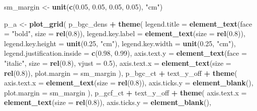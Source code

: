 \documentclass[
]{article}
\newenvironment{Shaded}{\begin{snugshade}}{\end{snugshade}}
\newcommand{\AttributeTok}[1]{\textcolor[rgb]{0.13,0.29,0.53}{#1}}
\newcommand{\FloatTok}[1]{\textcolor[rgb]{0.00,0.00,0.81}{#1}}
\newcommand{\FunctionTok}[1]{\textcolor[rgb]{0.13,0.29,0.53}{\textbf{#1}}}
\newcommand{\NormalTok}[1]{#1}
\newcommand{\OtherTok}[1]{\textcolor[rgb]{0.56,0.35,0.01}{#1}}
\newcommand{\SpecialCharTok}[1]{\textcolor[rgb]{0.81,0.36,0.00}{\textbf{#1}}}
\newcommand{\StringTok}[1]{\textcolor[rgb]{0.31,0.60,0.02}{#1}}
\begin{document}
\begin{Shaded}
\begin{Highlighting}[]
\NormalTok{sm\_margin }\OtherTok{\textless{}{-}} \FunctionTok{unit}\NormalTok{(}\FunctionTok{c}\NormalTok{(}\FloatTok{0.05}\NormalTok{, }\FloatTok{0.05}\NormalTok{, }\FloatTok{0.05}\NormalTok{, }\FloatTok{0.05}\NormalTok{), }\StringTok{"cm"}\NormalTok{)}

\NormalTok{p\_a }\OtherTok{\textless{}{-}} \FunctionTok{plot\_grid}\NormalTok{(}
\NormalTok{  p\_bgc\_dens }\SpecialCharTok{+} \FunctionTok{theme}\NormalTok{(}
    \AttributeTok{legend.title =} \FunctionTok{element\_text}\NormalTok{(}\AttributeTok{face =} \StringTok{"bold"}\NormalTok{, }\AttributeTok{size =} \FunctionTok{rel}\NormalTok{(}\FloatTok{0.8}\NormalTok{)),}
    \AttributeTok{legend.key.label =} \FunctionTok{element\_text}\NormalTok{(}\AttributeTok{size =} \FunctionTok{rel}\NormalTok{(}\FloatTok{0.8}\NormalTok{)),}
    \AttributeTok{legend.key.height =} \FunctionTok{unit}\NormalTok{(}\FloatTok{0.25}\NormalTok{, }\StringTok{"cm"}\NormalTok{),}
    \AttributeTok{legend.key.width =} \FunctionTok{unit}\NormalTok{(}\FloatTok{0.25}\NormalTok{, }\StringTok{"cm"}\NormalTok{),}
    \AttributeTok{legend.justification.inside =} \FunctionTok{c}\NormalTok{(}\FloatTok{0.98}\NormalTok{, }\FloatTok{0.99}\NormalTok{),}
    \AttributeTok{axis.text.y =} \FunctionTok{element\_text}\NormalTok{(}\AttributeTok{face =} \StringTok{"italic"}\NormalTok{, }\AttributeTok{size =} \FunctionTok{rel}\NormalTok{(}\FloatTok{0.8}\NormalTok{), }\AttributeTok{vjust =} \FloatTok{0.5}\NormalTok{),}
    \AttributeTok{axis.text.x =} \FunctionTok{element\_text}\NormalTok{(}\AttributeTok{size =} \FunctionTok{rel}\NormalTok{(}\FloatTok{0.8}\NormalTok{)),}
    \AttributeTok{plot.margin =}\NormalTok{ sm\_margin}
\NormalTok{  ),}
\NormalTok{  p\_bgc\_ct }\SpecialCharTok{+}\NormalTok{ text\_y\_off }\SpecialCharTok{+} \FunctionTok{theme}\NormalTok{(}
    \AttributeTok{axis.text.x =} \FunctionTok{element\_text}\NormalTok{(}\AttributeTok{size =} \FunctionTok{rel}\NormalTok{(}\FloatTok{0.8}\NormalTok{)),}
    \AttributeTok{axis.ticks.y =} \FunctionTok{element\_blank}\NormalTok{(),}
    \AttributeTok{plot.margin =}\NormalTok{ sm\_margin}
\NormalTok{  ),}
\NormalTok{  p\_gcf\_ct }\SpecialCharTok{+}\NormalTok{ text\_y\_off }\SpecialCharTok{+} \FunctionTok{theme}\NormalTok{(}
    \AttributeTok{axis.text.x =} \FunctionTok{element\_text}\NormalTok{(}\AttributeTok{size =} \FunctionTok{rel}\NormalTok{(}\FloatTok{0.8}\NormalTok{)),}
    \AttributeTok{axis.ticks.y =} \FunctionTok{element\_blank}\NormalTok{(),}

\end{Highlighting}
\end{Shaded}
\end{document}
